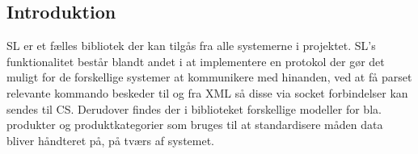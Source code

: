 \subsection{Introduktion}

\gls{SL} er et fælles bibliotek der kan tilgås fra alle systemerne i projektet. \gls{SL}'s funktionalitet består blandt andet i at implementere en protokol der gør det muligt for de forskellige systemer at kommunikere med hinanden, ved at få parset relevante kommando beskeder til og fra XML så disse via socket forbindelser kan sendes til \gls{CS}. Derudover findes der i biblioteket forskellige modeller for bla. produkter og produktkategorier som bruges til at standardisere måden data bliver håndteret på, på tværs af systemet.